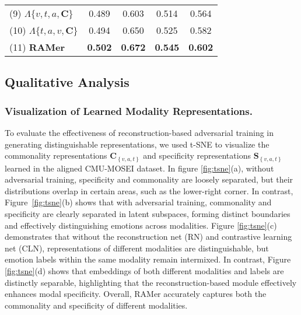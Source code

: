 \begin{table}[t]
\begin{center}
{\begin{tabular}{lcccc}
\hline

(9) $\Lambda {\{v,t,a,\bm{C}\}}$                                                               
& 0.489 & 0.603 & 0.514 & 0.564    
\\ 

(10) $\Lambda {\{t,a,v,\bm{C}\}} $                                                               
& 0.494 & 0.650  & 0.525 & 0.582    
\\

\hline

(11) \textbf{RAMer}                                                                                       
&\textbf{0.502} &\textbf{0.672} & \textbf{0.545} & \textbf{0.602}   
\\ 
\hline
\hline
\end{tabular}
}
\end{center}
\vspace{-1em}
\end{table}

\subsection{Qualitative Analysis}
\subsubsection{Visualization of Learned Modality Representations.}
To evaluate the effectiveness of reconstruction-based adversarial training in generating distinguishable representations, we used t-SNE to visualize the commonality representations $\bm{C}_{\left\{v,a,t \right\}}$ and specificity representations $\bm{S}_{\left\{v,a,t \right\}}$ learned in the aligned CMU-MOSEI dataset. In figure \ref{fig:tsne}(a), without adversarial training, specificity and commonality are loosely separated, but their distributions overlap in certain areas, such as the lower-right corner. In contrast, Figure~\ref{fig:tsne}(b) shows that with adversarial training, commonality and specificity are clearly separated in latent subspaces, forming distinct boundaries and effectively distinguishing emotions across modalities. 
Figure \ref{fig:tsne}(c) demonstrates that without the reconstruction net (RN) and contrastive learning net (CLN), representations of different modalities are distinguishable, but emotion labels within the same modality remain intermixed. In contrast, Figure \ref{fig:tsne}(d) shows that embeddings of both different modalities and labels are distinctly separable, highlighting that the reconstruction-based module effectively enhances modal specificity. Overall, RAMer accurately captures both the commonality and specificity of different modalities.

